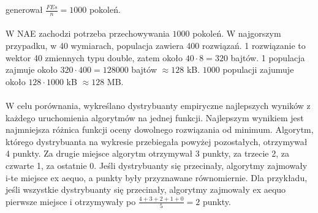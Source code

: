 \documentclass[12pt, a4paper]{article}
\begin{document}
generował $\frac{FEs}{n} = 1000$ pokoleń. \\
\\
W NAE zachodzi potrzeba przechowywania $1000$ pokoleń. W najgorszym przypadku, w 40 wymiarach, populacja zawiera 400 rozwiązań.
1 rozwiązanie to wektor 40 zmiennych typu double, zatem około $40\cdot8=320$ bajtów. 
1 populacja zajmuje około $320\cdot400 = 128000$ bajtów $\approx 128$ kB. 
$1000$ populacji zajumuje około $128 \cdot 1000$ kB $\approx 128$ MB. \\
\\
W celu porównania, wykreślano dystrybuanty empiryczne najlepszych wyników z każdego uruchomienia 
algorytmów na jednej funkcji. Najlepszym wynikiem jest najmniejsza różnica funkcji oceny dowolnego rozwiązania od minimum.
Algorytm, którego dystrybuanta na wykresie przebiegała powyżej pozostałych, otrzymywał 4 punkty. 
Za drugie miejsce algorytm otrzymywał 3 punkty, za trzecie 2, za czwarte 1, za ostatnie 0. 
Jeśli dystrybuanty się przecinały, algorytmy zajmowały i-te miejsce ex aequo, a punkty były przyznawane równomiernie.
Dla przykładu, jeśli wszystkie dystrybuanty się przecinały, algorytmy zajmowały ex aequo pierwsze miejsce i otrzymywały po
$\frac{4+3+2+1+0}{5}=2$ punkty.

\nocite{*}


\end{document}
